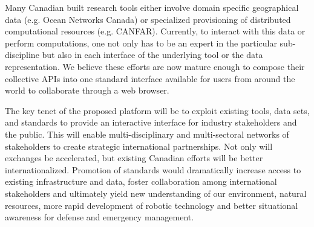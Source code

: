 
Many Canadian built research tools either involve domain specific
geographical data (e.g. Ocean Networks Canada) or specialized
provisioning of distributed computational resources
(e.g. CANFAR). Currently, to interact with this data or perform
computations, one not only has to be an expert in the particular
sub-discipline but also in each interface of the underlying tool or
the data representation.  We believe these efforts are now mature
enough to compose their collective APIs into one standard interface
available for users from around the world to collaborate through a web
browser.

The key tenet of the proposed platform will be to exploit existing
tools, data sets, and standards to provide an interactive interface
for industry stakeholders and the public.  This will enable
multi-disciplinary and multi-sectoral networks of stakeholders to
create strategic international partnerships. Not only will exchanges
be accelerated, but existing Canadian efforts will be better
internationalized.  Promotion of standards would dramatically increase
access to existing infrastructure and data, foster collaboration among
international stakeholders and ultimately yield new understanding of
our environment, natural resources, more rapid development of robotic
technology and better situational awareness for defense and emergency
management.
